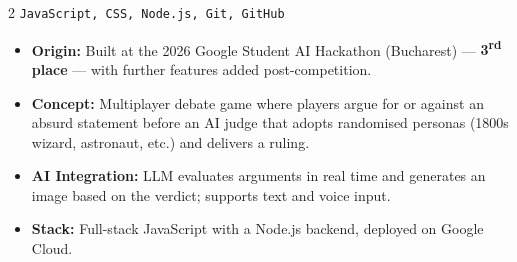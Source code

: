 \documentclass[a4paper,10pt]{article}
\newcommand{\project}[3]{%
  \noindent{\color{navy}\textbf{#1}}%
  \hfill{\small\color{sub}\texttt{#2}}\\[3pt]
  #3\vspace{5pt}%
}
\begin{document}
\begin{paracol}{2}
\project{Chaos Court}{JavaScript, CSS, Node.js, Git, GitHub}{%
\begin{itemize}
  \item \textbf{Origin:} Built at the 2026 Google Student AI Hackathon (Bucharest) — \textbf{\color{gold}3\textsuperscript{rd} place} — with further features added post-competition.
  \item \textbf{Concept:} Multiplayer debate game where players argue for or against an absurd statement before an AI judge that adopts randomised personas (1800s wizard, astronaut, etc.) and delivers a ruling.
  \item \textbf{AI Integration:} LLM evaluates arguments in real time and generates an image based on the verdict; supports text and voice input.
  \item \textbf{Stack:} Full-stack JavaScript with a Node.js backend, deployed on Google Cloud.
\end{itemize}}

\end{paracol}


\noindent{\color{rule}\rule{\linewidth}{0.3pt}}\\[-2pt]
\noindent{\color{gold}\rule{\linewidth}{0.6pt}}
\end{document}
